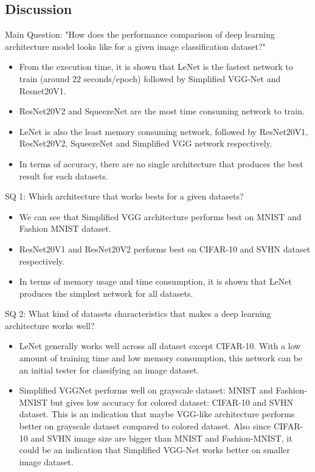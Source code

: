 \documentclass{beamer}
\begin{document}
\subsection{Discussion}
\begin{frame}
Main Question: "How does the performance comparison of deep learning architecture
model looks like for a given image classification dataset?"
\begin{itemize}
	\item From the execution time, it is shown that LeNet is the fastest network to train (around 22 seconds/epoch) followed by Simplified VGG-Net and Resnet20V1. 
	\item ResNet20V2 and SqueezeNet are the most time consuming network to train. 
	\item LeNet is also the least memory consuming network, followed by ResNet20V1, ResNet20V2, SqueezeNet and Simplified VGG network respectively. 
	\item In terms of accuracy, there are no single architecture that produces the best result for each datasets. 
\end{itemize} 
\end{frame}
\begin{frame}
SQ 1: Which architecture that works bests for a given datasets?
\begin{itemize}
	\item We can see that Simplified VGG architecture performs best on MNIST and Fashion MNIST dataset. 
	\item ResNet20V1 and ResNet20V2 performs best on CIFAR-10 and SVHN dataset respectively. 
	\item In terms of memory usage and time consumption, it is shown that LeNet produces the simplest network for all datasets.
\end{itemize}
\end{frame}
\begin{frame}
SQ 2: What kind of datasets characteristics that makes a deep learning architecture works well?
\begin{itemize}
	\item LeNet generally works well across all dataset except CIFAR-10. With a low amount of training time and low memory consumption, this network can be an initial tester for classifying an image dataset.
	\item Simplified VGGNet performs well on grayscale dataset: MNIST and Fashion-MNIST but gives low accuracy for colored dataset: CIFAR-10 and SVHN dataset. This is an indication that maybe VGG-like architecture performs better on grayscale dataset compared to colored dataset. Also since CIFAR-10 and SVHN image size are bigger than MNIST and Fashion-MNIST, it could be an indication that Simplified VGG-Net works better on smaller image dataset.
\end{itemize}
\end{frame}
\end{document}
